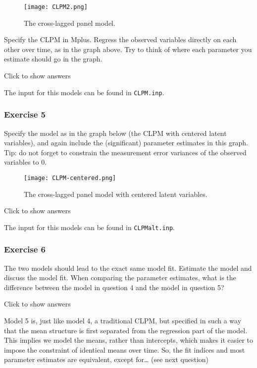\documentclass[
]{book}
\begin{document}
\begin{figure}
\centering
\texttt{[image: CLPM2.png]}
\caption{The cross-lagged panel model.}
\end{figure}

Specify the CLPM in Mplus. Regress the observed variables directly on each other over time, as in the graph above. Try to think of where each parameter you estimate should go in the graph.

Click to show answers

The input for this models can be found in \texttt{CLPM.inp}.

\hypertarget{exercise-5}{%
\subsubsection*{Exercise 5}\label{exercise-5}}

Specify the model as in the graph below (the CLPM with centered latent variables), and again include the (significant) parameter estimates in this graph. Tip: do not forget to constrain the measurement error variances of the observed variables to 0.

\begin{figure}
\centering
\texttt{[image: CLPM-centered.png]}
\caption{The cross-lagged panel model with centered latent variables.}
\end{figure}

Click to show answers

The input for this models can be found in \texttt{CLPMalt.inp}.

\hypertarget{exercise-6}{%
\subsubsection*{Exercise 6}\label{exercise-6}}

The two models should lead to the exact same model fit. Estimate the model and discuss the model fit. When comparing the parameter estimates, what is the difference between the model in question 4 and the model in question 5?

Click to show answers

Model 5 is, just like model 4, a traditional CLPM, but specified in such a way that the mean structure is first separated from the regression part of the model. This implies we model the means, rather than intercepts, which makes it easier to impose the constraint of identical means over time. So, the fit indices and most parameter estimates are equivalent, except for\ldots{} (see next question)
\end{document}
